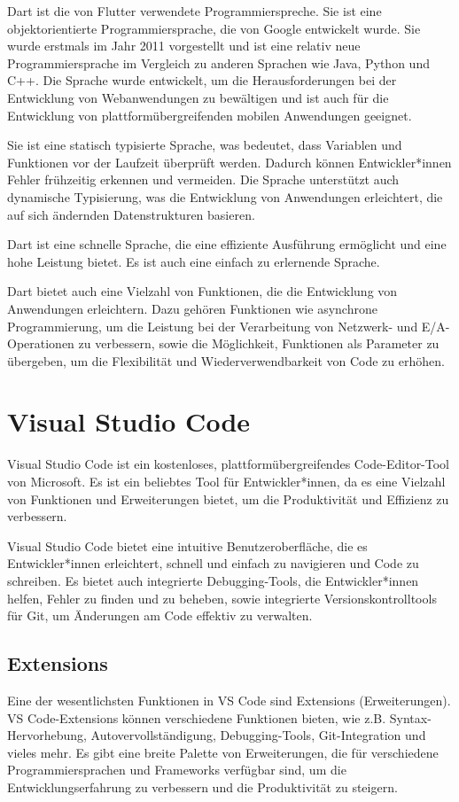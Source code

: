 Dart ist die von Flutter verwendete Programmierspreche. Sie ist eine objektorientierte Programmiersprache, die von Google entwickelt wurde. Sie wurde erstmals im Jahr 2011 vorgestellt und ist eine relativ neue Programmiersprache im Vergleich zu anderen Sprachen wie Java, 
Python und C++. Die Sprache wurde entwickelt, um die Herausforderungen bei der Entwicklung von Webanwendungen zu bewältigen und ist auch für die Entwicklung von plattformübergreifenden mobilen Anwendungen geeignet.

Sie ist eine statisch typisierte Sprache, was bedeutet, dass Variablen und Funktionen vor der Laufzeit überprüft werden. Dadurch können Entwickler*innen Fehler frühzeitig erkennen und vermeiden.
Die Sprache unterstützt auch dynamische Typisierung, was die Entwicklung von Anwendungen erleichtert, die auf sich ändernden Datenstrukturen basieren.

Dart ist eine schnelle Sprache, die eine effiziente Ausführung ermöglicht und eine hohe Leistung bietet. Es ist auch eine einfach zu erlernende Sprache.

Dart bietet auch eine Vielzahl von Funktionen, die die Entwicklung von Anwendungen erleichtern. Dazu gehören Funktionen wie asynchrone Programmierung, 
um die Leistung bei der Verarbeitung von Netzwerk- und E/A-Operationen zu verbessern, sowie die Möglichkeit, Funktionen als Parameter zu übergeben, 
um die Flexibilität und Wiederverwendbarkeit von Code zu erhöhen.
\pagebreak
\section{Visual Studio Code}
Visual Studio Code ist ein kostenloses, plattformübergreifendes Code-Editor-Tool von Microsoft. Es ist ein beliebtes Tool für Entwickler*innen, 
da es eine Vielzahl von Funktionen und Erweiterungen bietet, um die Produktivität und Effizienz zu verbessern.

Visual Studio Code bietet eine intuitive Benutzeroberfläche, die es Entwickler*innen erleichtert, schnell und einfach zu navigieren und Code zu schreiben. 
Es bietet auch integrierte Debugging-Tools, die Entwickler*innen helfen, Fehler zu finden und zu beheben, sowie integrierte Versionskontrolltools für Git, 
um Änderungen am Code effektiv zu verwalten.

\subsection{Extensions}
Eine der wesentlichsten Funktionen in VS Code sind Extensions (Erweiterungen). VS Code-Extensions können verschiedene Funktionen bieten, 
wie z.B. Syntax-Hervorhebung, Autovervollständigung, Debugging-Tools, Git-Integration und vieles mehr. 
Es gibt eine breite Palette von Erweiterungen, die für verschiedene Programmiersprachen und Frameworks verfügbar sind, 
um die Entwicklungserfahrung zu verbessern und die Produktivität zu steigern.

